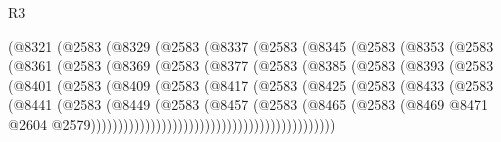 \begin{lexlean}{R3}
\begin{coremodule}
                (@8321
                  (@2583
                    (@8329
                      (@2583
                        (@8337
                          (@2583
                            (@8345
                              (@2583
                                (@8353
                                  (@2583
                                    (@8361
                                      (@2583
                                        (@8369
                                          (@2583
                                            (@8377
                                              (@2583
                                                (@8385
                                                  (@2583
                                                    (@8393
                                                      (@2583
                                                        (@8401
                                                          (@2583
                                                            (@8409
                                                              (@2583
                                                                (@8417
                                                                  (@2583
                                                                    (@8425
                                                                      (@2583
                                                                        (@8433
                                                                          (@2583
                                                                            (@8441
                                                                              (@2583
                                                                                (@8449
                                                                                  (@2583
                                                                                    (@8457
                                                                                      (@2583
                                                                                        (@8465
                                                                                          (@2583
                                                                                            (@8469
                                                                                              @8471
                                                                                              @2604
                                                                                              @2579)))))))))))))))))))))))))))))))))))))))))))))

\end{coremodule}
\end{lexlean}

